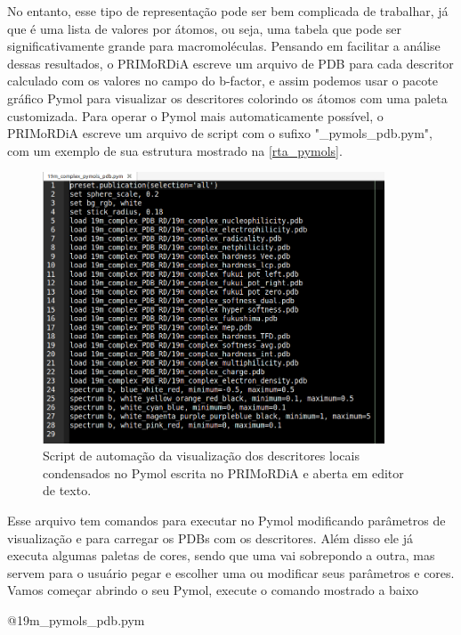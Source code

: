 \documentclass[a4paper,11pt]{refart}
\begin{document}
	No entanto, esse tipo de representação pode ser bem complicada de trabalhar, já que é uma lista de valores por átomos, ou seja, uma tabela que pode ser significativamente grande para macromoléculas. Pensando em facilitar a análise dessas resultados, o PRIMoRDiA escreve um arquivo de PDB para cada descritor calculado com os valores no campo do b-factor, e assim podemos usar o pacote gráfico Pymol para visualizar os descritores colorindo os átomos com uma paleta customizada. Para operar o Pymol mais automaticamente possível, o PRIMoRDiA escreve um arquivo de script com o sufixo "\_pymols\_pdb.pym", com um exemplo de sua estrutura mostrado na \autoref{rta_pymols}.
	
	\hspace*{-\leftmarginwidth}
	\begin{minipage}{\fullwidth}
		\begin{figure}[H]
			\begin{center}
				\includegraphics[width=4in]{rta_pymols}
				\caption{Script de automação da visualização dos descritores locais condensados no Pymol escrita no PRIMoRDiA e aberta em editor de texto.}
				\label{rta_pymols}
			\end{center}
		\end{figure}
	\end{minipage}

	Esse arquivo tem comandos para executar no Pymol modificando parâmetros de visualização e para carregar os PDBs com os descritores. Além disso ele já executa algumas paletas de cores, sendo que uma vai sobrepondo a outra, mas servem para o usuário pegar e escolher uma ou modificar seus parâmetros e cores. Vamos começar abrindo o seu Pymol, execute o comando mostrado a baixo

	\hspace*{-\leftmarginwidth}
	\begin{minipage}{\fullwidth}
		\begin{pymol}@19m_pymols_pdb.pym\end{pymol}
	\end{minipage}
\end{document}

